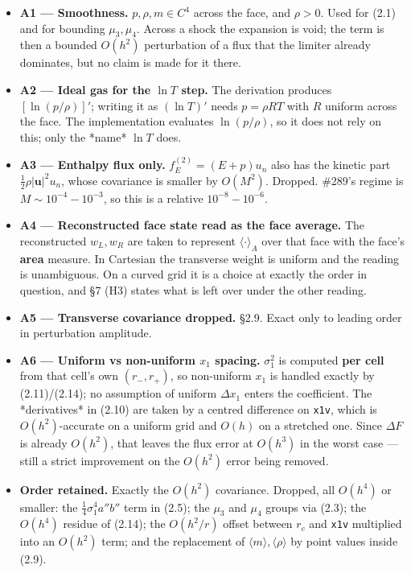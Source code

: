 \documentclass[11pt,a4paper]{article}
\begin{document}
\begin{itemize}
\item \textbf{A1 — Smoothness.} $p,\rho,m\in C^4$ across the face, and $\rho>0$. Used for
  (2.1) and for bounding $\mu_3,\mu_4$. Across a shock the expansion is void;
  the term is then a bounded $O(h^2)$ perturbation of a flux that the limiter
  already dominates, but no claim is made for it there.
\item \textbf{A2 — Ideal gas for the $\ln T$ step.} The derivation produces
  $[\ln(p/\rho)]'$; writing it as $(\ln T)'$ needs $p=\rho RT$ with $R$ uniform
  across the face. The implementation evaluates $\ln(p/\rho)$, so it does not
  rely on this; only the *name* $\ln T$ does.
\item \textbf{A3 — Enthalpy flux only.} $f_E^{(2)}=(E+p)u_n$ also has the kinetic part
  $\tfrac12\rho|\mathbf{u}|^2u_n$, whose covariance is smaller by $O(M^2)$.
  Dropped. \#289's regime is $M\sim10^{-4}\!-\!10^{-3}$, so this is a relative
  $10^{-8}\!-\!10^{-6}$.
\item \textbf{A4 — Reconstructed face state read as the face average.} The reconstructed
  $w_{L},w_{R}$ are taken to represent $\langle\cdot\rangle_A$ over that face
  with the face's \textbf{area} measure. In Cartesian the transverse weight is uniform
  and the reading is unambiguous. On a curved grid it is a choice at exactly the
  order in question, and §7 (H3) states what is left over under the other
  reading.
\item \textbf{A5 — Transverse covariance dropped.} §2.9. Exact only to leading order in
  perturbation amplitude.
\item \textbf{A6 — Uniform vs non-uniform $x_1$ spacing.} $\sigma_1^2$ is computed
  \textbf{per cell} from that cell's own $(r_-,r_+)$, so non-uniform $x_1$ is handled
  exactly by (2.11)/(2.14); no assumption of uniform $\Delta x_1$ enters the
  coefficient. The *derivatives* in (2.10) are taken by a centred difference on
  \texttt{x1v}, which is $O(h^2)$-accurate on a uniform grid and $O(h)$ on a stretched
  one. Since $\Delta F$ is already $O(h^2)$, that leaves the flux error at
  $O(h^3)$ in the worst case — still a strict improvement on the $O(h^2)$ error
  being removed.
\item \textbf{Order retained.} Exactly the $O(h^2)$ covariance. Dropped, all $O(h^4)$ or
  smaller: the $\tfrac14\sigma_1^4a''b''$ term in (2.5); the $\mu_3$ and $\mu_4$
  groups via (2.3); the $O(h^4)$ residue of (2.14); the $O(h^2/r)$ offset between
  $r_c$ and \texttt{x1v} multiplied into an $O(h^2)$ term; and the replacement of
  $\langle m\rangle,\langle\rho\rangle$ by point values inside (2.9).
\end{itemize}
\end{document}
